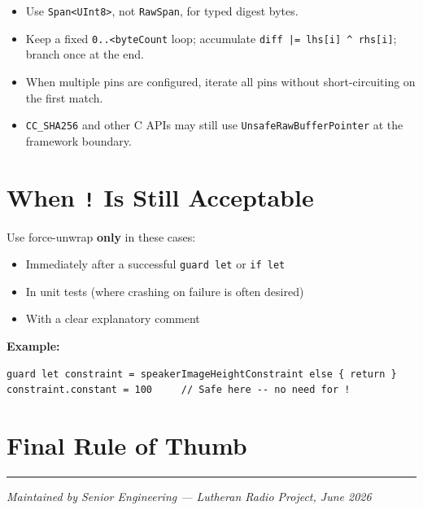 \documentclass[11pt,a4paper]{article}
\begin{document}
\begin{itemize}[leftmargin=*]
    \item Use \texttt{Span<UInt8>}, not \texttt{RawSpan}, for typed digest bytes.
    \item Keep a fixed \texttt{0..<byteCount} loop; accumulate \texttt{diff |= lhs[i] \^{} rhs[i]}; branch once at the end.
    \item When multiple pins are configured, iterate all pins without short-circuiting on the first match.
    \item \texttt{CC\_SHA256} and other C APIs may still use \texttt{UnsafeRawBufferPointer} at the framework boundary.
\end{itemize}

\section{When \texttt{!} Is Still Acceptable}

Use force-unwrap \textbf{only} in these cases:

\begin{itemize}[leftmargin=*]
    \item Immediately after a successful \texttt{guard let} or \texttt{if let}
    \item In unit tests (where crashing on failure is often desired)
    \item With a clear explanatory comment
\end{itemize}

\textbf{Example:}
\begin{lstlisting}
guard let constraint = speakerImageHeightConstraint else { return }
constraint.constant = 100     // Safe here -- no need for !
\end{lstlisting}

\section{Final Rule of Thumb}

\begin{center}
\end{center}

\vspace{1em}
\hrule
\vspace{0.5em}
\footnotesize
\textit{Maintained by Senior Engineering — Lutheran Radio Project, June 2026}
\end{document}

